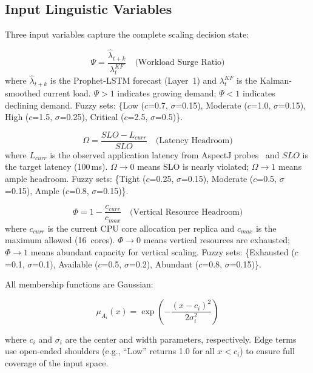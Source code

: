 \documentclass[conference]{IEEEtran}
\begin{document}
\subsection{Input Linguistic Variables}

Three input variables capture the complete scaling decision state:

\begin{equation}
\label{eq:psi}
\Psi = \frac{\hat{\lambda}_{t+k}}{\lambda^{KF}_t} \quad \text{(Workload Surge Ratio)}
\end{equation}
\noindent where $\hat{\lambda}_{t+k}$ is the Prophet-LSTM forecast (Layer~1) and $\lambda^{KF}_t$ is the Kalman-smoothed current load. $\Psi > 1$ indicates growing demand; $\Psi < 1$ indicates declining demand. Fuzzy sets: \{Low ($c$=0.7, $\sigma$=0.15), Moderate ($c$=1.0, $\sigma$=0.15), High ($c$=1.5, $\sigma$=0.25), Critical ($c$=2.5, $\sigma$=0.5)\}.

\begin{equation}
\label{eq:omega}
\Omega = \frac{SLO - L_{curr}}{SLO} \quad \text{(Latency Headroom)}
\end{equation}
\noindent where $L_{curr}$ is the observed application latency from AspectJ probes~\cite{solino2025autonomic} and $SLO$ is the target latency (100\,ms). $\Omega \to 0$ means SLO is nearly violated; $\Omega \to 1$ means ample headroom. Fuzzy sets: \{Tight ($c$=0.25, $\sigma$=0.15), Moderate ($c$=0.5, $\sigma$=0.15), Ample ($c$=0.8, $\sigma$=0.15)\}.

\begin{equation}
\label{eq:phi}
\Phi = 1 - \frac{c_{curr}}{c_{max}} \quad \text{(Vertical Resource Headroom)}
\end{equation}
\noindent where $c_{curr}$ is the current CPU core allocation per replica and $c_{max}$ is the maximum allowed (16~cores). $\Phi \to 0$ means vertical resources are exhausted; $\Phi \to 1$ means abundant capacity for vertical scaling. Fuzzy sets: \{Exhausted ($c$=0.1, $\sigma$=0.1), Available ($c$=0.5, $\sigma$=0.2), Abundant ($c$=0.8, $\sigma$=0.15)\}.

All membership functions are Gaussian:

\begin{equation}
\label{eq:gauss_mf}
\mu_{A_i}(x) = \exp\!\left(-\frac{(x - c_i)^2}{2\sigma_i^2}\right)
\end{equation}

\noindent where $c_i$ and $\sigma_i$ are the center and width parameters, respectively. Edge terms use open-ended shoulders (e.g., ``Low'' returns 1.0 for all $x < c_i$) to ensure full coverage of the input space.
\end{document}
